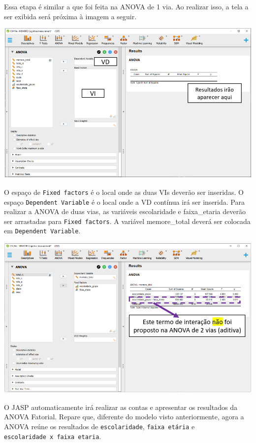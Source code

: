 \documentclass[
]{book}
\begin{document}
Essa etapa é similar a que foi feita na ANOVA de 1 via. Ao realizar isso, a tela a ser exibida será próxima à imagem a seguir.

\includegraphics{./img/cap_anova_two_way_interface.png}

O espaço de \texttt{Fixed\ factors} é o local onde as duas VIs deverão ser inseridas. O espaço \texttt{Dependent\ Variable} é o local onde a VD contínua irá ser inserida. Para realizar a ANOVA de duas vias, as variáveis escolaridade e faixa\_etaria deverão ser arrastadas para \texttt{Fixed\ factors}. A variável memore\_total deverá ser colocada em \texttt{Dependent\ Variable}.

\includegraphics{./img/cap_anova_two_way_execucao.png}

O JASP automaticamente irá realizar as contas e apresentar os resultados da ANOVA Fatorial. Repare que, diferente do modelo visto anteriormente, agora a ANOVA reúne os resultados de \texttt{escolaridade}, \texttt{faixa\ etária} e \texttt{escolaridade\ x\ faixa\ etaria}.
\end{document}

